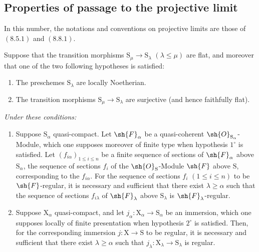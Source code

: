 \subsection{Properties of passage to the projective limit}
\label{subsection:IV.19.8}
\label{IV.19.8}

In this number, the notations and conventions on projective limits are those of $(8.5.1)$ and $(8.8.1)$.

\begin{proposition}[19.8.1]
\label{IV.19.8.1}
Suppose that the transition morphisms $\mathrm{S}_\mu\to\mathrm{S}_\lambda$ $(\lambda\leqslant\mu)$ are flat, and moreover that one of the two following hypotheses is satisfied:
\begin{enumerate}
\item[$1^\circ$] The preschemes $\mathrm{S}_\lambda$ are locally Noetherian.
\item[$2^\circ$] The transition morphisms $\mathrm{S}_\mu\to\mathrm{S}_\lambda$ are surjective (and hence faithfully flat).
\end{enumerate}

\emph{Under these conditions:}
\begin{enumerate}
\item[\rm(i)] Suppose $\mathrm{S}_\alpha$ quasi-compact. Let $\sh{F}_\alpha$ be a quasi-coherent $\sh{O}_{\mathrm{S}_\alpha}$-Module, which one supposes moreover of finite type when hypothesis $1^\circ$ is satisfied. Let $(f_{i\alpha})_{1\leqslant i\leqslant n}$ be a finite sequence of sections of $\sh{F}_\alpha$ above $\mathrm{S}_\alpha$, the sequence of sections $f_i$ of the $\sh{O}_\mathrm{S}$-Module $\sh{F}$ above $\mathrm{S}$, corresponding to the $f_{i\alpha}$. For the sequence of sections $f_i$ $(1\leqslant i\leqslant n)$ to be $\sh{F}$-regular, it is necessary and sufficient that there exist $\lambda\geqslant\alpha$ such that the sequence of sections $f_{i\lambda}$ of $\sh{F}_\lambda$ above $\mathrm{S}_\lambda$ is $\sh{F}_\lambda$-regular.
\item[\rm(ii)] Suppose $\mathrm{X}_\alpha$ quasi-compact, and let $j_\alpha:\mathrm{X}_\alpha\to\mathrm{S}_\alpha$ be an immersion, which one supposes locally of finite presentation when hypothesis $2^\circ$ is satisfied. Then, for the corresponding immersion $j:\mathrm{X}\to\mathrm{S}$ to be regular, it is necessary and sufficient that there exist $\lambda\geqslant\alpha$ such that $j_\lambda:\mathrm{X}_\lambda\to\mathrm{S}_\lambda$ is regular.
\end{enumerate}
\end{proposition}

